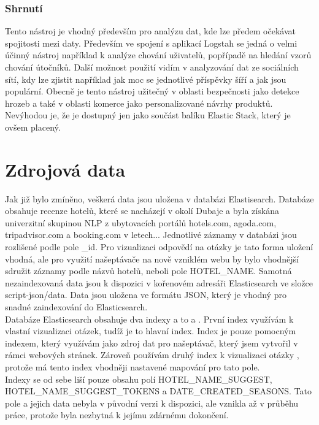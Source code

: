 \documentclass[czech,BP]{thesiskiv}
\begin{document}
\subsection{Shrnutí}
Tento nástroj je vhodný především pro analýzu dat, kde lze předem očekávat spojitosti mezi daty. Především ve spojení s aplikací Logstah se jedná o velmi účinný nástroj například k analýze chování uživatelů, popřípadě na hledání vzorů chování útočníků. Další možnost použití vidím v analyzování dat ze sociálních sítí, kdy lze zjistit například jak moc se jednotlivé příspěvky šíří a jak jsou populární. Obecně je tento nástroj užitečný v oblasti bezpečnosti jako detekce hrozeb a také v oblasti komerce jako personalizované návrhy produktů. Nevýhodou je, že je dostupný jen jako součást balíku Elastic Stack, který je ovšem placený.

\chapter{Zdrojová data}
Jak již bylo zmíněno, veškerá data jsou uložena v databázi Elastisearch. Databáze obsahuje recenze hotelů, které se nacházejí v okolí Dubaje a byla získána univerzitní skupinou NLP z ubytovacích portálů hotels.com, agoda.com, tripadvisor.com a booking.com v letech... Jednotlivé záznamy v databázi jsou rozlišené podle pole \_id. Pro vizualizaci odpovědí na otázky je tato forma uložení vhodná, ale pro využití našeptávače na nově vzniklém  webu by bylo vhodnější sdružit záznamy podle názvů hotelů, neboli pole HOTEL\_NAME. Samotná nezaindexovaná data jsou k dispozici v kořenovém adresáři Elasticsearch ve složce script-json/data. Data jsou uložena ve formátu JSON, který je vhodný pro snadné zaindexování do Elasticsearch.
\\
Databáze Elasticsearch obsahuje dva indexy a to  a . První index využívám k vlastní vizualizaci otázek, tudíž je to hlavní index. Index  je pouze pomocným indexem, který využívám jako zdroj dat pro našeptávač, který jsem vytvořil v rámci webových stránek. Zároveň používám druhý index k vizualizaci otázky , protože má tento index vhodněji nastavené mapování pro tato pole.
\\
Indexy se od sebe liší pouze obsahu polí HOTEL\_NAME\_SUGGEST, HOTEL\_NAME\_SUGGEST\_TOKENS a DATE\_CREATED\_SEASONS. Ta\-to pole a jejich data nebyla v původní verzi k dispozici, ale vznikla až v průběhu práce, protože byla nezbytná k jejímu zdárnému dokončení. 
\end{document}
